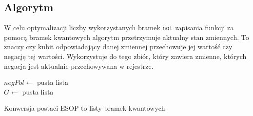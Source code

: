 \subsection{Algorytm}
W celu optymalizacji liczby wykorzystanych bramek \texttt{not} zapisania funkcji za pomocą bramek kwantowych algorytm przetrzymuje aktualny stan zmiennych. To znaczy czy kubit odpowiadający danej zmiennej przechowuje jej wartość czy negację tej wartości. Wykorzystuje do tego zbiór, który zawiera zmienne, których negacja jest aktualnie przechowywana w rejestrze.\\
\begin{pseudokod}[H]
    $negPol \leftarrow$ pusta lista\\
    $G \leftarrow$ pusta lista\\
    \caption{Konwersja postaci ESOP to listy bramek kwantowych}\label{alg:esop}
\end{pseudokod}
